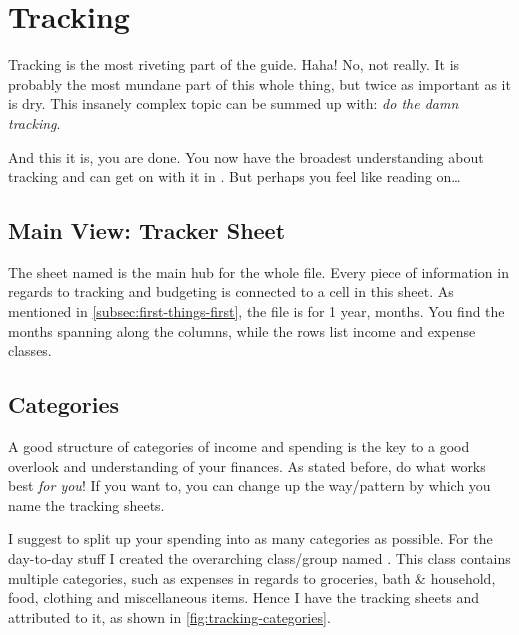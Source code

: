 \section{Tracking}
\label{sec:tracking}

Tracking is the most riveting part of the guide.
Haha!
No, not really.
It is probably the most mundane part of this whole thing, but twice as important as it is dry.
This insanely complex topic can be summed up with: \emph{do the damn tracking}.

And this it is, you are done.
You now have the broadest understanding about tracking and can get on with it in \tfn.
But perhaps you feel like reading on\ldots

\subsection{Main View: Tracker Sheet}
\label{subsec:main-tracker-sheet}

The sheet named  is the main hub for the whole file.
Every piece of information in regards to tracking and budgeting is connected to a cell in this sheet.
As mentioned in \autoref{subsec:first-things-first}, the file is for 1 year,  months.
You find the months spanning along the columns, while the rows list income and expense classes.

\begin{specialnote}
	
\end{specialnote}

\subsection{Categories}
\label{subsec:tracking-categories}

A good structure of categories of income and spending is the key to a good overlook and understanding of your finances.
As stated before, do what works best \emph{for you}!
If you want to, you can change up the way/pattern by which you name the tracking sheets.

I suggest to split up your spending into as many categories as possible.
For the day-to-day stuff I created the overarching class/group named .
This class contains multiple categories, such as expenses in regards to groceries, bath \& household, food, clothing and miscellaneous items.
Hence I have the tracking sheets  and  attributed to it, as shown in \autoref{fig:tracking-categories}.

